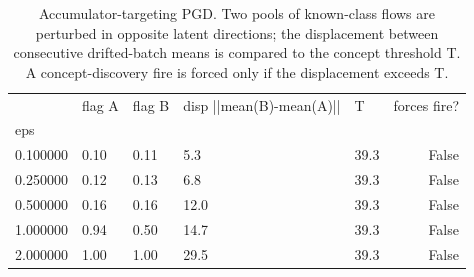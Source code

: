 \begin{table}
\caption{Accumulator-targeting PGD. Two pools of known-class flows are perturbed in opposite latent directions; the displacement between consecutive drifted-batch means is compared to the concept threshold T. A concept-discovery fire is forced only if the displacement exceeds T.}
\label{tab:rq3-pgd-accumulator}
\begin{tabular}{lllllr}
\toprule
 & flag A & flag B & disp ||mean(B)-mean(A)|| & T & forces fire? \\
eps &  &  &  &  &  \\
\midrule
0.100000 & 0.10 & 0.11 & 5.3 & 39.3 & False \\
0.250000 & 0.12 & 0.13 & 6.8 & 39.3 & False \\
0.500000 & 0.16 & 0.16 & 12.0 & 39.3 & False \\
1.000000 & 0.94 & 0.50 & 14.7 & 39.3 & False \\
2.000000 & 1.00 & 1.00 & 29.5 & 39.3 & False \\
\bottomrule
\end{tabular}
\end{table}
